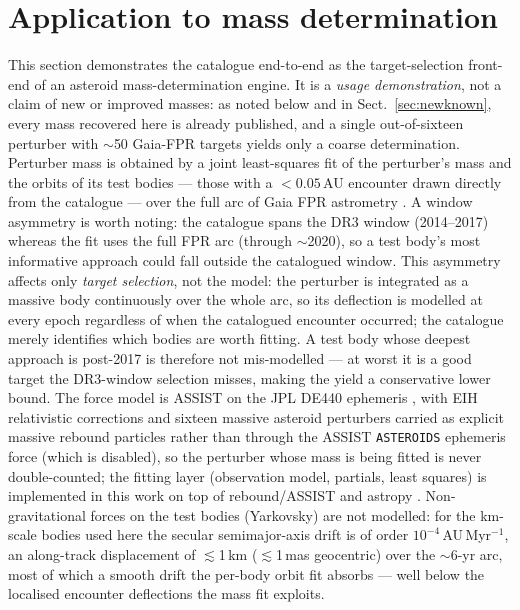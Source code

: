 \documentclass{aa}
\begin{document}
\section{Application to mass determination}
\label{sec:mass}

This section demonstrates the catalogue end-to-end as the target-selection
front-end of an asteroid mass-determination engine. It is a \emph{usage
demonstration}, not a claim of new or improved masses: as noted below and in
Sect.~\ref{sec:newknown}, every mass recovered here is already published, and a
single out-of-sixteen perturber with $\sim$50 Gaia-FPR targets yields only a
coarse determination. Perturber mass is obtained by a joint least-squares
fit of the perturber's mass and the orbits of its test bodies --- those with a
$<0.05$\,AU encounter drawn directly from the catalogue --- over the full arc of
Gaia FPR astrometry \citep{gaiafpr2023}. A window asymmetry is worth noting: the
catalogue spans the DR3 window (2014--2017) whereas the fit uses the full FPR arc
(through $\sim$2020), so a test body's most informative approach could fall
outside the catalogued window. This asymmetry affects only \emph{target
selection}, not the model: the perturber is integrated as a massive body
continuously over the whole arc, so its deflection is modelled at every epoch
regardless of when the catalogued encounter occurred; the catalogue merely
identifies which bodies are worth fitting. A test body whose deepest approach is
post-2017 is therefore not mis-modelled --- at worst it is a good target the
DR3-window selection misses, making the yield a conservative lower bound. The
force model is ASSIST \citep{holman2023} on the JPL DE440 ephemeris
\citep{park2021}, with EIH relativistic corrections and sixteen massive asteroid
perturbers carried as explicit massive rebound particles rather than through the
ASSIST \texttt{ASTEROIDS} ephemeris force (which is disabled), so the perturber
whose mass is being fitted is never double-counted; the
fitting layer (observation model, partials, least squares) is implemented in
this work on top of rebound/ASSIST \citep{rein2012, rein2015ias15, holman2023}
and astropy \citep{astropy2022}. Non-gravitational forces on the test bodies
(Yarkovsky) are not modelled: for the km-scale bodies used here the secular
semimajor-axis drift is of order $10^{-4}$\,AU\,Myr$^{-1}$, an along-track
displacement of $\lesssim$1\,km ($\lesssim$1\,mas geocentric) over the
$\sim$6-yr arc, most of which a smooth drift the per-body orbit fit absorbs ---
well below the localised encounter deflections the mass fit exploits.
\end{document}
